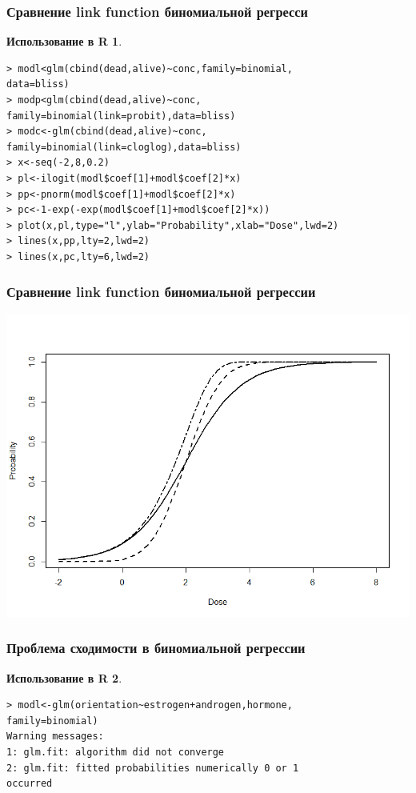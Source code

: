 \documentclass{beamer}
\newtheorem{exmpr}{Использование в R}
\begin{document}
\begin{frame}[containsverbatim]
\frametitle{Сравнение link function биномиальной регресси}
\begin{exmpr}
\begin{verbatim}
> modl<glm(cbind(dead,alive)~conc,family=binomial,
data=bliss)
> modp<glm(cbind(dead,alive)~conc,
family=binomial(link=probit),data=bliss)
> modc<-glm(cbind(dead,alive)~conc,
family=binomial(link=cloglog),data=bliss)
> x<-seq(-2,8,0.2)
> pl<-ilogit(modl$coef[1]+modl$coef[2]*x)
> pp<-pnorm(modl$coef[1]+modl$coef[2]*x)
> pc<-1-exp(-exp(modl$coef[1]+modl$coef[2]*x))
> plot(x,pl,type="l",ylab="Probability",xlab="Dose",lwd=2)
> lines(x,pp,lty=2,lwd=2)
> lines(x,pc,lty=6,lwd=2)
\end{verbatim}
\end{exmpr}

\end{frame}

\begin{frame}
\frametitle{Сравнение link function биномиальной регрессии}
\begin{center}
\includegraphics[width=1\textwidth,height=0.8\textheight]{linkplot1.png}
\end{center}
\end{frame}


\begin{frame}[containsverbatim]
\frametitle{Проблема сходимости в биномиальной регрессии}
\begin{exmpr}
\begin{verbatim}
> modl<-glm(orientation~estrogen+androgen,hormone,
family=binomial)
Warning messages:
1: glm.fit: algorithm did not converge 
2: glm.fit: fitted probabilities numerically 0 or 1
occurred
\end{verbatim}
\end{exmpr}

\end{frame}
\end{document}
